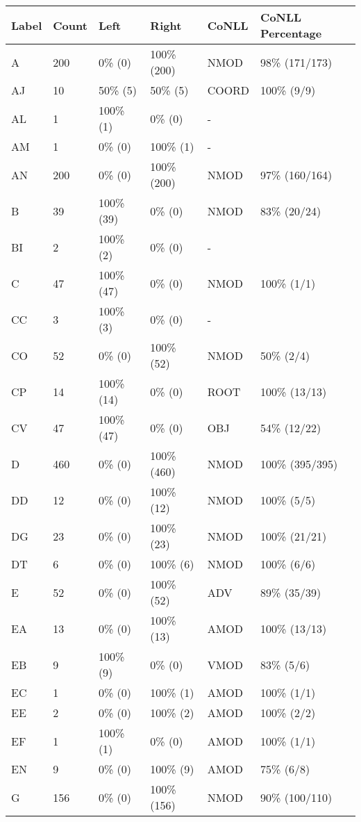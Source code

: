 \begin{figure*}
\begin{tabular}{|l|l|l|l||l|l|}
\hline
Label & Count & Left & Right & CoNLL & CoNLL Percentage\\ 
\hline
 A & 200 & 0\% (0) & 100\% (200) & NMOD & 98\% (171/173) \\ 
\hline
 AJ & 10 & 50\% (5) & 50\% (5) & COORD & 100\% (9/9) \\ 
\hline
 AL & 1 & 100\% (1) & 0\% (0) & - &  \\ 
\hline
 AM & 1 & 0\% (0) & 100\% (1) & - &  \\ 
\hline
 AN & 200 & 0\% (0) & 100\% (200) & NMOD & 97\% (160/164) \\ 
\hline
 B & 39 & 100\% (39) & 0\% (0) & NMOD & 83\% (20/24) \\ 
\hline
 BI & 2 & 100\% (2) & 0\% (0) & - &  \\ 
\hline
 C & 47 & 100\% (47) & 0\% (0) & NMOD & 100\% (1/1) \\ 
\hline
 CC & 3 & 100\% (3) & 0\% (0) & - &  \\ 
\hline
 CO & 52 & 0\% (0) & 100\% (52) & NMOD & 50\% (2/4) \\ 
\hline
 CP & 14 & 100\% (14) & 0\% (0) & ROOT & 100\% (13/13) \\ 
\hline
 CV & 47 & 100\% (47) & 0\% (0) & OBJ & 54\% (12/22) \\ 
\hline
 D & 460 & 0\% (0) & 100\% (460) & NMOD & 100\% (395/395) \\ 
\hline
 DD & 12 & 0\% (0) & 100\% (12) & NMOD & 100\% (5/5) \\ 
\hline
 DG & 23 & 0\% (0) & 100\% (23) & NMOD & 100\% (21/21) \\ 
\hline
 DT & 6 & 0\% (0) & 100\% (6) & NMOD & 100\% (6/6) \\ 
\hline
 E & 52 & 0\% (0) & 100\% (52) & ADV & 89\% (35/39) \\ 
\hline
 EA & 13 & 0\% (0) & 100\% (13) & AMOD & 100\% (13/13) \\ 
\hline
 EB & 9 & 100\% (9) & 0\% (0) & VMOD & 83\% (5/6) \\ 
\hline
 EC & 1 & 0\% (0) & 100\% (1) & AMOD & 100\% (1/1) \\ 
\hline
 EE & 2 & 0\% (0) & 100\% (2) & AMOD & 100\% (2/2) \\ 
\hline
 EF & 1 & 100\% (1) & 0\% (0) & AMOD & 100\% (1/1) \\ 
\hline
 EN & 9 & 0\% (0) & 100\% (9) & AMOD & 75\% (6/8) \\ 
\hline
 G & 156 & 0\% (0) & 100\% (156) & NMOD & 90\% (100/110) \\ 

\end{tabular}
\end{figure*}
